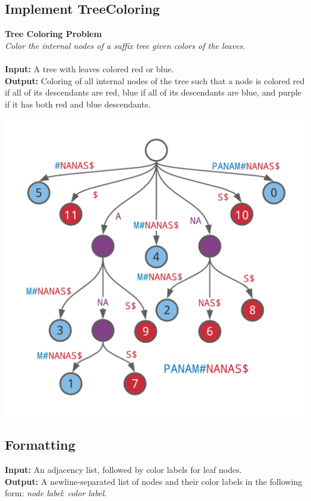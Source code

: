 \documentclass{article}
\begin{document}
\subsection{Implement TreeColoring}
\hline\vspace{5}
\noindent \textbf{Tree Coloring Problem}\\
\emph{Color the internal nodes of a suffix tree given colors of the leaves}.\\ \\
\textbf{Input:} A tree with leaves colored red or blue. \\
\textbf{Output:} Coloring of all internal nodes of the tree such that a node is colored red if all of its descendants are red, blue if all of its descendants are blue, and purple if it has both red and blue descendants.
\begin{center}
    \includegraphics[scale=0.2]{c9/logos/9P.png} 
\end{center}
\hline\vspace{5}

\subsection*{Formatting}
\textbf{Input:} An adjacency list, followed by color labels for leaf nodes.\\
\noindent \textbf{Output:} A newline-separated list of nodes and their color labels in the following form: \emph{node label}: \emph{color label}.
\end{document}
